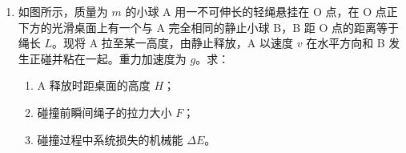 \documentclass[\gkver]{gaokaozhenti}
\begin{document}
\begin{enumerate}
{（4）设重垂线与 $y$ 轴间的夹角为 $\theta$，则

$x$ 轴方向有 $x_{2} -$ 2$x_{1} = g$sin$\theta$(2$T$)$^{2}$

$y$ 轴方向在 $y_{2} -$ 2$y_{1} = g$cos$\theta$(2$T$)$^{2}$

联立解得 tan$\theta = \frac{{{x_2} - 2{x_1}}}{{{y_2} - 2{y_1}}}$
}

\item
如图所示，质量为 $m$ 的小球 A 用一不可伸长的轻绳悬挂在 O 点，在 O 点正下方的光滑桌面上有一个与 A 完全相同的静止小球 B，B 距 O 点的距离等于绳长 $L$。现将 A 拉至某一高度，由静止释放，A 以速度 $v$ 在水平方向和 B 发生正碰并粘在一起。重力加速度为 $g$。求：
\begin{enumerate}
	\item
	A 释放时距桌面的高度 $H$；
	\item
	碰撞前瞬间绳子的拉力大小 $F$；
	\item
	碰撞过程中系统损失的机械能 $\Delta E$。
\end{enumerate}


\end{enumerate}
\end{document}
